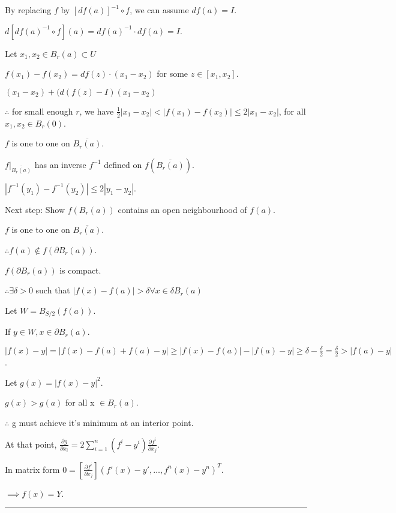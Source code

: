 \documentclass[twoside]{article}
\newenvironment{proof}{{\bf Proof:}}{\hfill\rule{2mm}{2mm}}
\begin{document}
    \begin{proof}
        By replacing $f$ by $[df(a)]^{-1} \circ f$, we can assume $df(a) = I$. 

        $d[df(a)^{-1}\circ f](a) = df(a)^{-1} \cdot df(a)=I.$

        Let $x_1, x_2 \in B_r(a) \subset U$

        $f(x_1) - f(x_2) = df(z) \cdot (x_1 -x_2)$ for some $z \in [x_1, x_2]$. 

        $(x_1 - x_2) + (d(f(z) - I)(x_1 - x_2)$

        $\therefore $ for small enough $r$, we have $\frac12|x_1 - x_2| < |f(x_1) - f(x_2)| \leq 2|x_1 - x_2|$, for all $x_1, x_2 \in B_r(0)$.

        $f$ is one to one on $\overline{B_r(a)}$.

        $f\vert_{\overline {B_r(a)}}$ has an inverse $f^{-1}$ defined on $f(\overline {B_r(a)})$.

        $|f^{-1}(y_1) - f^{-1}(y_2)| \leq 2 |y_1 - y_2|$. 

        Next step: Show $f(B_r(a))$ contains an open neighbourhood of $f(a)$. 

        $f$ is one to one on $\overline{B_r(a)}$. 

        $\therefore f(a) \not\in f(\partial B_r(a))$. 

        $f(\partial B_r(a))$ is compact. 

        $\therefore \exists \delta > 0$ such that $|f(x) - f(a)| > \delta \forall x \in \delta B_r(a)$

        Let $W = B_{S/2}(f(a))$.
        
        If $y \in W, x \in \partial B_r(a)$. 

        $|f(x) - y| = |f(x) - f(a) + f(a) - y| \geq |f(x) - f(a)| - |f(a) - y| \geq \delta - \frac\delta 2 = \frac{\delta}{2} > |f(a) - y|$. 

        Let $g(x) = |f(x) - y|^2$. 

        $g(x) > g(a)$ for all x $\in B_r(a)$. 

        $\therefore$ g must achieve it's minimum at an interior point. 

        At that point, $\frac{\partial g}{\partial x_i} = 2 \sum_{i=1}^n (f^{i} - y^i)\frac{\partial f^i}{\partial  x_j}$. 

        In matrix form $0 = [\frac{\partial f^i}{\partial  x_j}](f'(x) - y', \dots, f^n(x) - y^n)^T$.

        $\implies f(x) = Y$. 


\end{proof}
\end{document}

